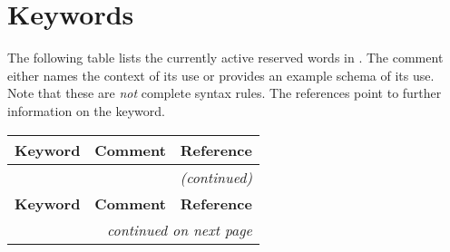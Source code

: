 
\chapter{Keywords}\label{app:Keywords}

The following table lists the currently active reserved words in \Cal.
The comment either names the context of its use or provides an example
schema of its use. Note that these are {\em not} complete syntax
rules. The references point to further information on the keyword.

\begin{longtable}{|r|p{6cm}|l|}
  {\bf Keyword}  &    {\bf Comment} & {\bf Reference} \\\hline\hline \endfirsthead
  \multicolumn{3}{r}{\em (continued)}\\
  {\bf Keyword}  &    {\bf Comment} & {\bf Reference} \\\hline\hline \endhead
  \multicolumn{3}{r}{\em continued on next page} \endfoot
  \hline\endlastfoot


\end{longtable}
